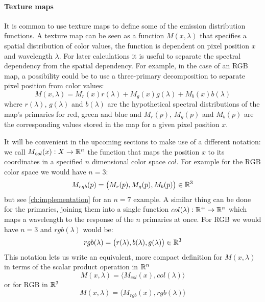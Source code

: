 \paragraph{Texture maps}
It is common to use texture maps to define some of the emission distribution
functions. A texture map can be seen as a function $M(x,\lambda)$ that specifies
a spatial distribution of color values, the function is dependent on pixel
position $x$ and wavelength $\lambda$.
For later calculations it is useful to separate the spectral dependency from the
spatial dependency. For example, in the case of an \gls{RGB} map, a possibility
could be to use a three-primary decomposition to separate pixel position from
color values:
\begin{equation}
M(x,\lambda) = M_r(x) r(\lambda) + M_g(x) g(\lambda) + M_b(x) b(\lambda)
\end{equation}
where $r(\lambda)$, $g(\lambda)$ and $b(\lambda)$ are the hypothetical spectral
distributions of the map's primaries for red, green and blue and $M_r(p)$,
$M_g(p)$ and $M_b(p)$ are the corresponding values stored in the map for a
given pixel position $x$.

It will be convenient in the upcoming sections to make use of a different
notation: we call $M_{col}(x): X\to\mathbb{R}^n$ the function that maps the position $x$
to its coordinates in a specified $n$ dimensional color space $col$. For example
for the \gls{RGB} color space we would have $n = 3$:
\begin{equation}
M_{rgb}(p) = \big(M_r(p), M_g(p), M_b(p)\big) \in \mathbb{R}^3
\end{equation}
but see \cref{ch:implementation} for an $n=7$ example. A similar thing
can be done for the primaries, joining them into a single function
$col(\lambda): \mathbb{R}^+\to\mathbb{R}^n$ which maps a wavelength to the response of the $n$
primaries at once. For \gls{RGB} we would have $n = 3$ and $rgb(\lambda)$ would be:
\begin{equation}
rgb(\lambda) = \big(r(\lambda), b(\lambda), g(\lambda)\big) \in\mathbb{R}^3
\end{equation}
This notation lets us write an equivalent, more compact definition for
$M(x,\lambda)$ in terms of the scalar product operation in $\mathbb{R}^n$
\begin{equation}
M(x,\lambda) = \big\langle M_{col}(x), col(\lambda) \big\rangle
\end{equation}
or for \gls{RGB} in $\mathbb{R}^3$
\begin{equation}
M(x,\lambda) = \big\langle M_{rgb}(x), rgb(\lambda) \big\rangle
\end{equation}


